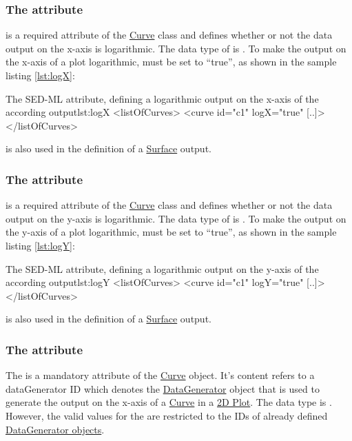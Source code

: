 \subsubsection{The  attribute}
\label{sec:logX}
 is a required attribute of the \hyperref[class:curve]{Curve} class and defines whether or not the data output on the x-axis is logarithmic. The data type of  is . 
To make the output on the x-axis of a plot logarithmic,  must be set to ``true'', as shown in the sample listing \ref{lst:logX}: 
\begin{myXmlLst}{The SED-ML   attribute, defining a logarithmic output on the x-axis of the according output}{lst:logX}
<listOfCurves>
  <curve id="c1"  logX="true" [..]>
</listOfCurves>
\end{myXmlLst}
 is also used in the definition of a \hyperref[class:surface]{Surface} output.

\subsubsection{The  attribute}
\label{sec:logY}
 is a required attribute of the \hyperref[class:curve]{Curve} class and defines whether or not the data output on the y-axis is logarithmic. The data type of  is . 
To make the output on the y-axis of a plot logarithmic,  must be set to ``true'', as shown in the sample listing \ref{lst:logY}: 
\begin{myXmlLst}{The SED-ML  attribute, defining a logarithmic output on the y-axis of the according output}{lst:logY}
<listOfCurves>
  <curve id="c1"  logY="true" [..]>
</listOfCurves>
\end{myXmlLst}
 is also used in the definition of a \hyperref[class:surface]{Surface} output.

\subsubsection{The  attribute}
\label{sec:xDataReference}
The  is a mandatory attribute of the \hyperref[class:curve]{Curve} object. It's content refers to a dataGenerator ID which denotes the \hyperref[class:dataGenerator]{DataGenerator} object that is used to generate the output on the x-axis of a \hyperref[class:curve]{Curve} in a \hyperref[class:plot2D]{2D Plot}. 
The  data type is . However, the valid values for the  are restricted to the IDs of already defined \hyperref[class:dataGenerator]{DataGenerator objects}.

